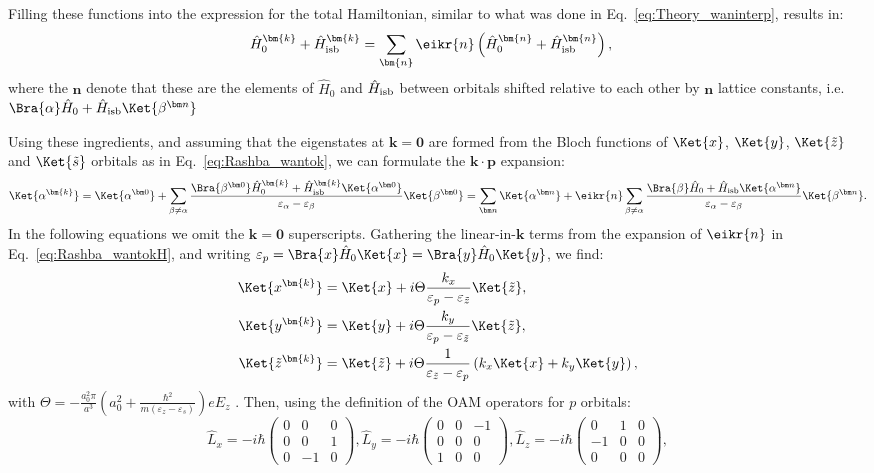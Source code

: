 Filling these functions into the expression for the total Hamiltonian, similar to what was done in Eq.~\eqref{eq:Theory_waninterp}, results in:
\begin{align}
	\label{eq:Rashba_wantokH}
	\hat{H}_0^{\bm{k}} + \hat{H}_{\rm isb}^{\bm{k}} &= \sum_{\bm{n}} \eikr{n} \left(\hat{H}_0^{\bm{n}} + \hat{H}_{\rm isb}^{\bm{n}}\right),
\end{align}
where the $\bm n$ denote that these are the elements of $\hat{H}_0$ and $\hat{H}_{\rm isb}$ between orbitals shifted relative to each other by $\bm n$ lattice constants, i.e. $\Bra{\alpha} \hat H_0 + \hat H_{\rm isb} \Ket{\beta^{\bm n}}$
    
Using these ingredients, and assuming that the eigenstates at $\bm k = \bm 0$ are formed from the Bloch functions of $\Ket{x}$, $\Ket{y}$, $\Ket{\tilde{z}}$ and $\Ket{\tilde{s}}$ orbitals as in Eq.~\eqref{eq:Rashba_wantok}, we can formulate the $\bm k \cdot \bm p$ expansion:
\begin{equation}
	\label{eq:Rashba_kdotp}
	\Ket{\alpha^{\bm{k}}}=\Ket{\alpha^{\bm 0}} + \sum_{\beta \neq \alpha} \frac{\Bra{\beta^{\bm 0}} \hat{H}_0^{\bm{k}} + \hat{H}_{\rm isb}^{\bm{k}} \Ket{\alpha^{\bm 0}}}{\varepsilon_{\alpha} - \varepsilon_{\beta}} \Ket{\beta^{\bm 0}} = \sum_{\bm n} \Ket{\alpha^{\bm n}} + \eikr{n} \sum_{\beta \neq \alpha} \frac{\Bra{\beta} \hat{H}_0 + \hat{H}_{\rm isb} \Ket{\alpha^{\bm n}}}{\varepsilon_{\alpha} - \varepsilon_{\beta}} \Ket{\beta^{\bm n}}.
\end{equation}
In the following equations we omit the $\bm{k}=\bm 0$ superscripts.
Gathering the linear-in-$\bm k$ terms from the expansion of $\eikr{n}$ in Eq.~\eqref{eq:Rashba_wantokH}, and writing $\varepsilon_p = \Bra{x} \hat{H}_0 \Ket{x} = \Bra{y} \hat{H}_0 \Ket{y}$, we find:
\begin{align}
	\Ket{x^{\bm{k}}} &= \Ket{x} + i \Theta \frac{k_x}{\varepsilon_p - \varepsilon_{\tilde{z}}}\Ket{\tilde{z}}, \\
	\Ket{y^{\bm{k}}} &= \Ket{y} + i \Theta \frac{k_y}{\varepsilon_p - \varepsilon_{\tilde{z}}}\Ket{\tilde{z}},\\
	\Ket{\tilde{z}^{\bm{k}}} &= \Ket{\tilde{z}} + i \Theta \frac{1}{\varepsilon_{\tilde{z}} - \varepsilon_p} \left(k_x\Ket{x} + k_y\Ket{y}\right),
\end{align}
with $\Theta = -\frac{a_0^2 \pi}{a^3}\left(a_0^2 + \frac{\hbar^2}{m(\varepsilon_z - \varepsilon_s)}\right) e E_z$ .
Then, using the definition of the \gls{OAM} operators for $p$ orbitals:
\begin{equation}
	\hat{L}_x =-i\hbar\left(\begin{matrix}0&0&0\\0&0&1\\0&-1&0\end{matrix}\right), \hat{L}_y = -i\hbar \left(\begin{matrix}0&0&-1\\0&0&0\\1&0&0\end{matrix}\right), \hat{L}_z =-i\hbar\left(\begin{matrix}0&1&0\\-1&0&0\\0&0&0\end{matrix}\right),
\end{equation}

